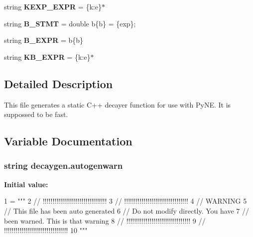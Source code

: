 \begin{DoxyCompactItemize}
\item 
string {\bfseries K\+E\+X\+P\+\_\+\+E\+X\+PR} = \textquotesingle{}\{k\+:e\}$\ast$\textquotesingle{}\hypertarget{namespacedecaygen_a1a2219faac5fc5808f70487f0baff85b}{}\label{namespacedecaygen_a1a2219faac5fc5808f70487f0baff85b}

\item 
string {\bfseries B\+\_\+\+S\+T\+MT} = \textquotesingle{}double b\{b\} = \{exp\};\textquotesingle{}\hypertarget{namespacedecaygen_a8ad381995532ef87bb0a164a2b267fca}{}\label{namespacedecaygen_a8ad381995532ef87bb0a164a2b267fca}

\item 
string {\bfseries B\+\_\+\+E\+X\+PR} = \textquotesingle{}b\{b\}\textquotesingle{}\hypertarget{namespacedecaygen_ae2470bc63bdc8595efbcca7fbcf9cf3e}{}\label{namespacedecaygen_ae2470bc63bdc8595efbcca7fbcf9cf3e}

\item 
string {\bfseries K\+B\+\_\+\+E\+X\+PR} = \textquotesingle{}\{k\+:e\}$\ast$\textquotesingle{}\hypertarget{namespacedecaygen_a833a3e41af563936f326b6ab8245c965}{}\label{namespacedecaygen_a833a3e41af563936f326b6ab8245c965}

\end{DoxyCompactItemize}


\subsection{Detailed Description}
\begin{DoxyVerb}This file generates a static C++ decayer function for use with PyNE.
It is suppossed to be fast.
\end{DoxyVerb}
 

\subsection{Variable Documentation}
\subsubsection[{\texorpdfstring{autogenwarn}{autogenwarn}}]{\setlength{\rightskip}{0pt plus 5cm}string decaygen.\+autogenwarn}\hypertarget{namespacedecaygen_a1f5d36fb20b4dda8ba0e121344b99bae}{}\label{namespacedecaygen_a1f5d36fb20b4dda8ba0e121344b99bae}
{\bfseries Initial value\+:}
\begin{DoxyCode}
1 = \textcolor{stringliteral}{"""}
2 \textcolor{stringliteral}{// !!!!!!!!!!!!!!!!!!!!!!!!!!!!!!!!!}
3 \textcolor{stringliteral}{// !!!!!!!!!!!!!!!!!!!!!!!!!!!!!!!!!}
4 \textcolor{stringliteral}{//              WARNING}
5 \textcolor{stringliteral}{// This file has been auto generated}
6 \textcolor{stringliteral}{// Do not modify directly. You have}
7 \textcolor{stringliteral}{// been warned. This is that warning}
8 \textcolor{stringliteral}{// !!!!!!!!!!!!!!!!!!!!!!!!!!!!!!!!!}
9 \textcolor{stringliteral}{// !!!!!!!!!!!!!!!!!!!!!!!!!!!!!!!!!}
10 \textcolor{stringliteral}{"""}
\end{DoxyCode}
